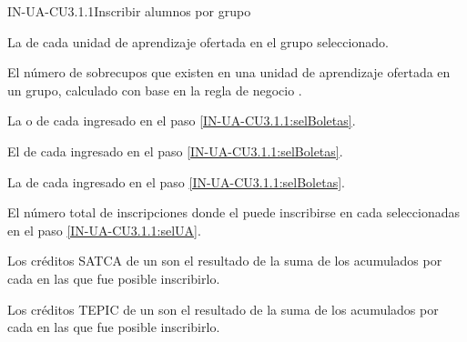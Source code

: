 \begin{UseCase}{IN-UA-CU3.1.1}{Inscribir alumnos por grupo}
{\begin{Titemize}
    		\Titem La  de cada unidad de aprendizaje ofertada en el grupo seleccionado.
    		
    		\Titem El número de sobrecupos que existen en una unidad de aprendizaje ofertada en un grupo, calculado con base en la regla de negocio .
    		
    		\Titem La  o  de cada  ingresado en el paso \ref{IN-UA-CU3.1.1:selBoletas}.
    		
    		\Titem El  de cada  ingresado en el paso \ref{IN-UA-CU3.1.1:selBoletas}.
    		
    		\Titem La  de cada  ingresado en el paso \ref{IN-UA-CU3.1.1:selBoletas}.
    		
    		\Titem El número total de inscripciones donde el  puede inscribirse en cada  seleccionadas en el paso \ref{IN-UA-CU3.1.1:selUA}.
    		
    		\Titem Los créditos SATCA de un  son el resultado de la suma de los  acumulados por cada  en las que fue posible inscribirlo. 
    		
    		\Titem Los créditos TEPIC de un  son el resultado de la suma de los  acumulados por cada  en las que fue posible inscribirlo.
    	\end{Titemize}	
    }
\end{UseCase}
